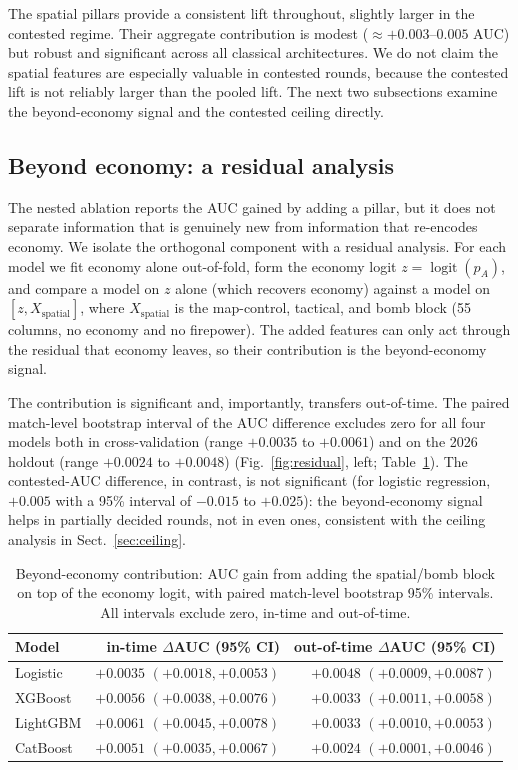 \documentclass[11pt,a4paper]{article}
\begin{document}
The spatial pillars provide a consistent lift throughout, slightly larger in the contested
regime. Their aggregate contribution is modest ($\approx +0.003$--$0.005$ AUC) but robust and
significant across all classical architectures. We do not claim the spatial features are
especially valuable in contested rounds, because the contested lift is not reliably larger than
the pooled lift. The next two subsections examine the beyond-economy signal and the contested
ceiling directly.

\subsection{Beyond economy: a residual analysis}
\label{sec:residual}

The nested ablation reports the AUC gained by adding a pillar, but it does not separate information
that is genuinely new from information that re-encodes economy. We isolate the orthogonal component
with a residual analysis. For each model we fit economy alone out-of-fold, form the economy logit
$z = \operatorname{logit}(p_A)$, and compare a model on $z$ alone (which recovers economy) against a
model on $[z, X_{\text{spatial}}]$, where $X_{\text{spatial}}$ is the map-control, tactical, and bomb
block (55 columns, no economy and no firepower). The added features can only act through the residual
that economy leaves, so their contribution is the beyond-economy signal.

The contribution is significant and, importantly, transfers out-of-time. The paired match-level
bootstrap interval of the AUC difference excludes zero for all four models both in cross-validation
(range $+0.0035$ to $+0.0061$) and on the 2026 holdout (range $+0.0024$ to $+0.0048$)
(Fig.~\ref{fig:residual}, left; Table~\ref{tab:residual}). The contested-AUC difference, in contrast,
is not significant (for logistic regression, $+0.005$ with a 95\% interval of $-0.015$ to $+0.025$):
the beyond-economy signal helps in partially decided rounds, not in even ones, consistent with the
ceiling analysis in Sect.~\ref{sec:ceiling}.

\begin{table}[t]
\centering
\caption{Beyond-economy contribution: AUC gain from adding the spatial/bomb block on top of the economy
logit, with paired match-level bootstrap 95\% intervals. All intervals exclude zero, in-time and
out-of-time.}
\label{tab:residual}
\begin{tabular}{lrr}
\toprule
Model & in-time $\Delta$AUC (95\% CI) & out-of-time $\Delta$AUC (95\% CI) \\
\midrule
Logistic     & $+0.0035$ $(+0.0018, +0.0053)$ & $+0.0048$ $(+0.0009, +0.0087)$ \\
XGBoost      & $+0.0056$ $(+0.0038, +0.0076)$ & $+0.0033$ $(+0.0011, +0.0058)$ \\
LightGBM     & $+0.0061$ $(+0.0045, +0.0078)$ & $+0.0033$ $(+0.0010, +0.0053)$ \\
CatBoost     & $+0.0051$ $(+0.0035, +0.0067)$ & $+0.0024$ $(+0.0001, +0.0046)$ \\
\bottomrule
\end{tabular}
\end{table}
\end{document}
